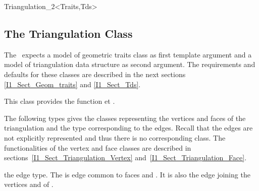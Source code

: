 \begin{ccClassTemplate}{Triangulation_2<Traits,Tds>}
\subsection{The Triangulation Class \protect \ccClassTemplateName} 

The \ccClassTemplateName\  expects a model of  {geometric traits} class
as first template argument and a model of {triangulation data structure}
as second argument. The requirements  and defaults for these classes 
are described in the next sections \ref{I1_Sect_Geom_traits}
and \ref{I1_Sect_Tds}.


This class provides the function  et .

\ccTypes
{}
\ccThreeToTwo

\ccGlue
{}

\ccGlue
{}
\ccGlue
{}

The following types gives the classes representing the vertices and faces
 of the triangulation and the type corresponding to the edges.
Recall that the edges are not explicitly represented and thus there is no corresponding class.
The functionalities of the vertex and face classes
 are described in sections~\ref{I1_Sect_Triangulation_Vertex}
and~\ref{I1_Sect_Triangulation_Face}.

\ccGlue
{}
\ccGlue
{}
 {the edge type.
The  is edge common to faces  and 
. It is also the edge joining the vertices
 and  of .}


\end{ccClassTemplate}
